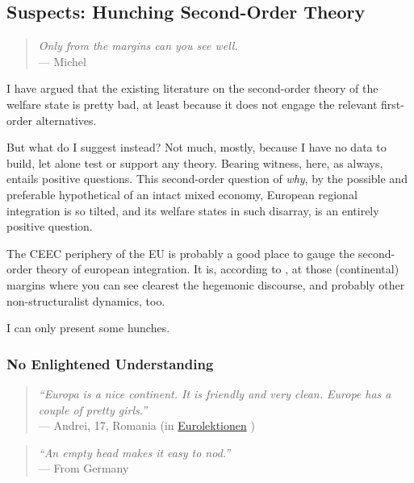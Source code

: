 \subsection[Suspects]{Suspects: Hunching Second-Order Theory}

\begin{quote}
	\emph{Only from the margins can you see well.}\\
	--- Michel \cite{Foucault-1972-aa} 
\end{quote}

I have argued that the existing literature on the second-order theory of the welfare state is pretty bad, at least because it does not engage the relevant first-order alternatives. 

But what do I suggest instead? Not much, mostly, because I have no data to build, let alone test or support any theory. Bearing witness, here, as always, entails positive questions. This second-order question of \emph{why}, by the possible and preferable hypothetical of an intact mixed economy, European regional integration is so tilted, and its welfare states in such disarray, is an entirely positive question.

The \gls{CEEC} periphery of the \gls{EU} is probably a good place to gauge the second-order theory of european integration. It is, according to \cite{Foucault-1972-aa}, at those (continental) margins where you can see clearest the hegemonic discourse, and probably other non-structuralist dynamics, too.

I can only present some hunches.

\subsubsection[No Enlightened Understanding]{No Enlightened Understanding}

\begin{quote}
	\emph{``Europa is a nice continent. It is friendly and very clean. Europe has a couple of pretty girls.''}\\
	--- Andrei, 17, Romania (in \href{http://eurolektionen.de}{Eurolektionen} \citeyear{DeRuffray2010})
\end{quote}

\begin{quote}
	\emph{``An empty head makes it easy to nod.''}\\
	--- From Germany
\end{quote}

